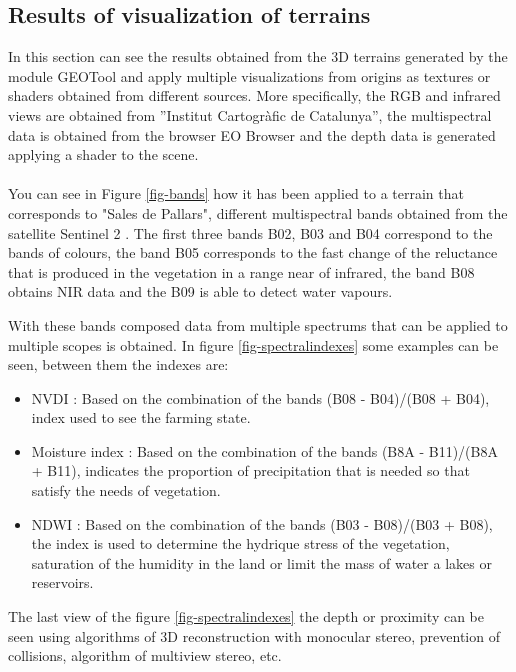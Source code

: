 \documentclass[10pt,a4paper,twocolumn,twoside]{article}
\begin{document}
\subsection{Results of visualization of terrains}
In this section can see the results obtained from the 3D terrains generated by the module GEOTool and apply multiple visualizations from origins as textures or shaders obtained from different sources. More specifically, the RGB and infrared views are obtained from ''Institut Cartogràfic de Catalunya'', the multispectral data is obtained from the browser EO Browser \cite{eobrowser} and the depth data is generated applying a shader to the scene.
\\
\\
You can see in Figure \ref{fig-bands} how it has been applied to a terrain that corresponds to "Sales de Pallars", different multispectral bands obtained from the satellite Sentinel 2 \cite{sentinel2}. The first three bands B02, B03 and B04 correspond to the bands of colours, the band B05 corresponds to the fast change of the reluctance that is produced in the vegetation in a range near of infrared, the band B08 obtains NIR \cite{nir} data and the B09 is able to detect water vapours.

With these bands composed data from multiple spectrums that can be applied to multiple scopes is obtained. In figure \ref{fig-spectralindexes} some examples can be seen, between them the indexes are:

\begin{itemize}
\setlength\itemsep{0em}
\item 
{
	NVDI \cite{ndvi}: Based on the combination of the bands (B08 - B04)/(B08 + B04), index used to see the farming state.
}
\item
{
	Moisture index \cite{moisture}: Based on the combination of the bands (B8A - B11)/(B8A + B11), indicates the proportion of precipitation that is needed so that satisfy the needs of vegetation.
}
\item
{
	NDWI \cite{ndwi}: Based on the combination of the bands (B03 - B08)/(B03 + B08), the index is used to determine the hydrique stress of the vegetation, saturation of the humidity in the land or limit the mass of water a lakes or reservoirs.
}
\end{itemize} 

The last view of the figure \ref{fig-spectralindexes} the depth or proximity can be seen using  algorithms of 3D reconstruction with monocular stereo, prevention of collisions, algorithm of multiview stereo, etc.
\end{document}
